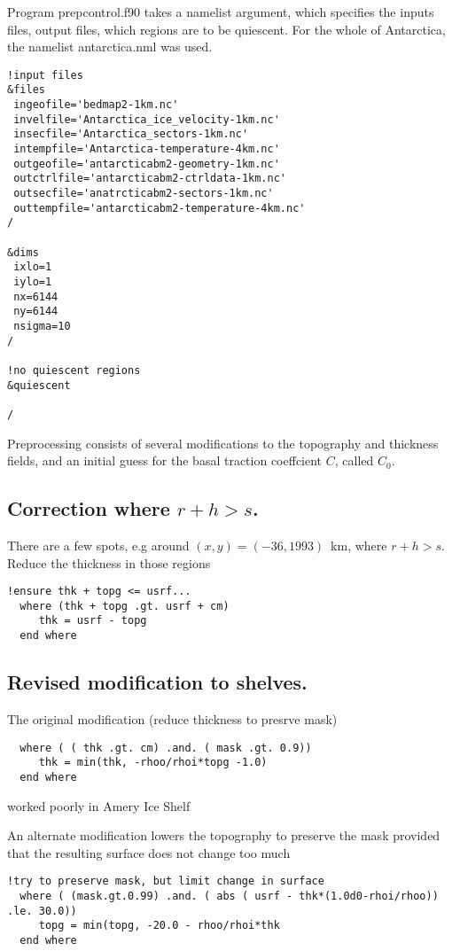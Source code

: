 \documentclass{article}
\newcommand{\usrf}{s}
\newcommand{\topg}{r}
\newcommand{\thk}{h}
\begin{document}
Program prepcontrol.f90 takes a namelist argument, which specifies the inputs files, output files, which regions
are to be quiescent. For the whole of Antarctica, the namelist
antarctica.nml was used.
\begin{verbatim}
!input files
&files
 ingeofile='bedmap2-1km.nc'
 invelfile='Antarctica_ice_velocity-1km.nc'
 insecfile='Antarctica_sectors-1km.nc'
 intempfile='Antarctica-temperature-4km.nc'
 outgeofile='antarcticabm2-geometry-1km.nc'
 outctrlfile='antarcticabm2-ctrldata-1km.nc'
 outsecfile='anatrcticabm2-sectors-1km.nc'
 outtempfile='antarcticabm2-temperature-4km.nc'
/

&dims
 ixlo=1
 iylo=1
 nx=6144
 ny=6144
 nsigma=10
/

!no quiescent regions
&quiescent

/
\end{verbatim}

Preprocessing consists of several modifications to the topography and thickness
fields, and an initial guess for the basal traction coeffcient $C$, called $C_0$.

\subsection{\label{sec::limthk} Correction where $\topg + \thk > \usrf$.}

There are a few spots, e.g around $(x,y) = (-36,1993)$~km, where $\topg + \thk > \usrf$.
Reduce the thickness in those regions
\begin{lstlisting}
!ensure thk + topg <= usrf... 
  where (thk + topg .gt. usrf + cm)
     thk = usrf - topg
  end where
\end{lstlisting}

\subsection{\label{sec::limthk} Revised modification to shelves.}

The original modification (reduce thickness to presrve mask)
\begin{lstlisting}
  where ( ( thk .gt. cm) .and. ( mask .gt. 0.9))
     thk = min(thk, -rhoo/rhoi*topg -1.0)
  end where
\end{lstlisting}
worked poorly in Amery Ice Shelf

An alternate modification lowers the topography to preserve 
the mask provided that the resulting surface does not
change too much
\begin{lstlisting}
!try to preserve mask, but limit change in surface
  where ( (mask.gt.0.99) .and. ( abs ( usrf - thk*(1.0d0-rhoi/rhoo)) .le. 30.0))
     topg = min(topg, -20.0 - rhoo/rhoi*thk
  end where
\end{lstlisting}
\end{document}
